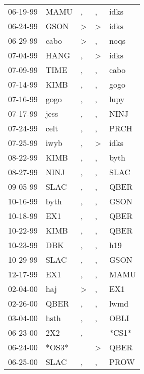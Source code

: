 \begin{supertabular}{lllll}
 06-19-99 &   MAMU &                , &             , &   idks \\
 06-24-99 &   GSON &     \textgreater &  \textgreater &   idks \\
 06-29-99 &   cabo &     \textgreater &             , &   noqs \\
 07-04-99 &   HANG &                , &  \textgreater &   idks \\
 07-09-99 &   TIME &                , &             , &   cabo \\
 07-14-99 &   KIMB &                , &             , &   gogo \\
 07-16-99 &   gogo &                , &             , &   lupy \\
 07-17-99 &   jess &                , &             , &   NINJ \\
 07-24-99 &   celt &                , &             , &   PRCH \\
 07-25-99 &   iwyb &                , &  \textgreater &   idks \\
 08-22-99 &   KIMB &                , &             , &   byth \\
 08-27-99 &   NINJ &                , &             , &   SLAC \\
 09-05-99 &   SLAC &                , &             , &   QBER \\
 10-16-99 &   byth &                , &             , &   GSON \\
 10-18-99 &    EX1 &                , &             , &   QBER \\
 10-22-99 &   KIMB &                , &             , &   QBER \\
 10-23-99 &    DBK &                , &             , &    h19 \\
 10-29-99 &   SLAC &                , &             , &   GSON \\
 12-17-99 &    EX1 &                , &             , &   MAMU \\
 02-04-00 &    haj &     \textgreater &             , &    EX1 \\
 02-26-00 &   QBER &                , &             , &   lwmd \\
 03-04-00 &   hsth &                , &             , &   OBLI \\
 06-23-00 &    2X2 &                , &               &  *CS1* \\
 06-24-00 &  *OS3* &                  &  \textgreater &   QBER \\
 06-25-00 &   SLAC &                , &             , &   PROW \\

\end{supertabular}
